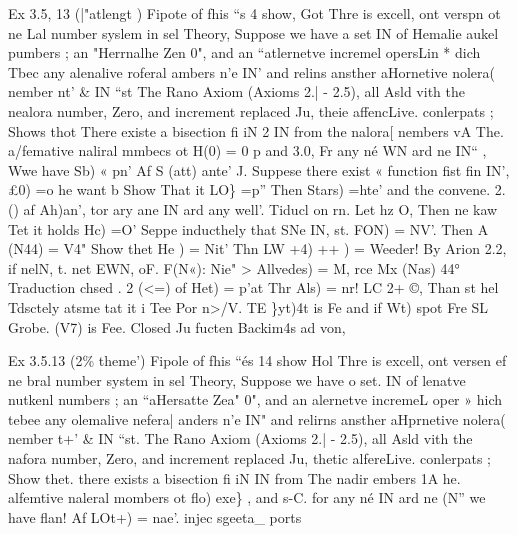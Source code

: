 \documentclass[a4paper,12pt]{article}
\begin{document}
\vspace{10pt}

    Ex 3.5, 13 (|"atlengt )    Fipote of fhis “s 4 show, Got Thre is excell, ont verspn ot ne Lal number syslem in sel Theory,    Suppose we have a set IN of Hemalie aukel pumbers ; an "Herrnalhe Zen 0", and   an “atlernetve incremel opersLin * dich Tbec any alenalive roferal ambers n’e IN’   and relins ansther aHornetive nolera( nember nt’ \& IN “st The Rano Axiom (Axioms 2.| - 2.5),  all Asld vith the nealora number, Zero, and increment replaced Ju, theie affencLive. conlerpats ;    Shows thot There existe a bisection fi iN 2 IN from the nalora[ nembers vA    The. a/femative naliral mmbecs ot H(0) = 0 p and 3.0, Fr any né WN ard  ne IN“ , Wwe have Sb) « pn’ Af S (att) ante’    J. Suppese there exist « function fist fin IN’, £0) =o  he want b Show That it LO\} =p” Then Stars) =hte’ and the convene.  2. () af Ah)an’, tor ary ane IN ard any well’.    Tiducl on rn. Let hz O, Then ne kaw Tet it holds Hc) =O’    Seppe inducthely that SNe IN, st. FON) = NV’. Then A (N44) = V4"  Show thet He ) = Nit’ Thn LW +4) ++ ) = Weeder!  By Arion 2.2, if nelN, t. net EWN, oF.    F(N«): Nie" > Allvedes) = M, rce Mx (Nas) 44°  Traduction chsed .    2 (<=) of Het) = p'at Thr Als) = nr!  LC 2+ ©, Than st hel  Tdsctely atsme tat it i Tee Por n>/V.  TE \}yt)4t is Fe and if Wt) spot Fre SL Grobe.  (V7) is Fee.  Closed Ju fucten    Backim4s ad von, 

\vspace{10pt}

\par

\vspace{10pt}

    Ex 3.5.13 (2\% theme’)  Fipole of fhis “és 14 show Hol Thre is excell, ont versen ef ne bral number system in sel Theory,    Suppose we have o set. IN of lenatve nutkenl numbers ; an “aHersatte Zea" 0", and   an alernetve incremeL oper » hich tebee any olemalive nefera| anders n’e IN"   and relirns ansther aHprnetive nolera( nember t+’ \& IN “st. The Rano Axiom (Axioms 2.| - 2.5),  all Asld vith the nafora number, Zero, and increment replaced Ju, thetic alfereLive. conlerpats ;    Show thet. there exists a bisection fi iN IN from The nadir embers 1A  he. alfemtive naleral mombers ot flo) exe\} , and s-C. for any né IN ard  ne (N” we have flan! Af LOt+) = nae’.    injec  sgeeta\_    ports 

\vspace{10pt}

\par
\end{document}
